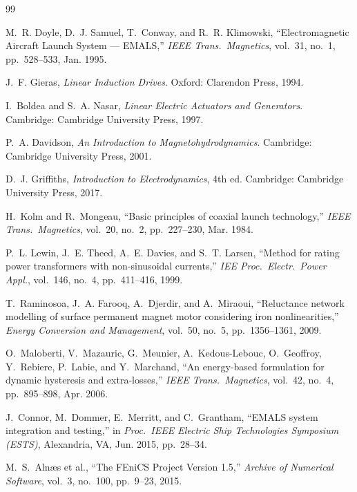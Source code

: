 \documentclass[12pt,letterpaper]{article}
\begin{document}
\newpage
\begin{thebibliography}{99}

M.~R. Doyle, D.~J. Samuel, T.~Conway, and R.~R. Klimowski,
``Electromagnetic Aircraft Launch System --- EMALS,''
\textit{IEEE Trans.\ Magnetics}, vol.~31, no.~1, pp.~528--533, Jan. 1995.

J.~F. Gieras,
\textit{Linear Induction Drives}.
Oxford: Clarendon Press, 1994.

I.~Boldea and S.~A. Nasar,
\textit{Linear Electric Actuators and Generators}.
Cambridge: Cambridge University Press, 1997.

P.~A. Davidson,
\textit{An Introduction to Magnetohydrodynamics}.
Cambridge: Cambridge University Press, 2001.

D.~J. Griffiths,
\textit{Introduction to Electrodynamics}, 4th ed.
Cambridge: Cambridge University Press, 2017.

H.~Kolm and R.~Mongeau,
``Basic principles of coaxial launch technology,''
\textit{IEEE Trans.\ Magnetics}, vol.~20, no.~2, pp.~227--230, Mar. 1984.

P.~L. Lewin, J.~E. Theed, A.~E. Davies, and S.~T. Larsen,
``Method for rating power transformers with non-sinusoidal currents,''
\textit{IEE Proc.\ Electr.\ Power Appl.}, vol.~146, no.~4, pp.~411--416, 1999.

T.~Raminosoa, J.~A. Farooq, A.~Djerdir, and A.~Miraoui,
``Reluctance network modelling of surface permanent magnet motor considering iron
nonlinearities,''
\textit{Energy Conversion and Management}, vol.~50, no.~5, pp.~1356--1361, 2009.

O.~Maloberti, V.~Mazauric, G.~Meunier, A.~Kedous-Lebouc, O.~Geoffroy, Y.~Rebiere,
P.~Labie, and Y.~Marchand,
``An energy-based formulation for dynamic hysteresis and extra-losses,''
\textit{IEEE Trans.\ Magnetics}, vol.~42, no.~4, pp.~895--898, Apr. 2006.

J.~Connor, M.~Dommer, E.~Merritt, and C.~Grantham,
``EMALS system integration and testing,''
in \textit{Proc.\ IEEE Electric Ship Technologies Symposium (ESTS)},
Alexandria, VA, Jun. 2015, pp.~28--34.

M.~S.~Aln\ae{}s et al.,
``The FEniCS Project Version 1.5,''
\textit{Archive of Numerical Software}, vol.~3, no.~100, pp.~9--23, 2015.

\end{thebibliography}
\end{document}
